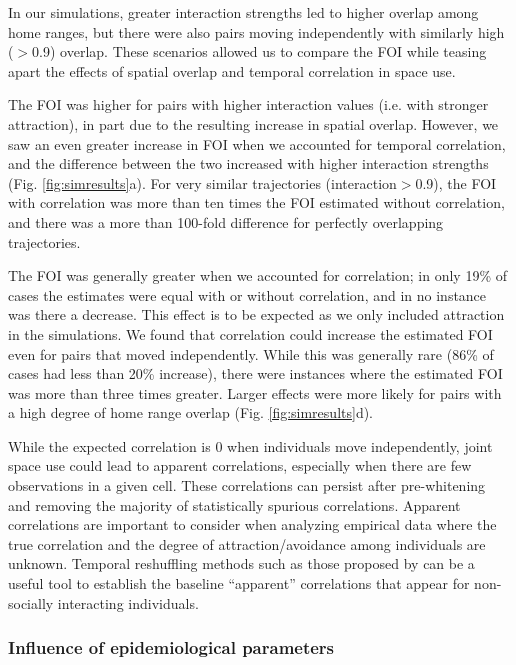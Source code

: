 ﻿\documentclass[11pt]{article}
\begin{document}
In our simulations, greater interaction strengths led to higher overlap among home ranges, but there were also pairs moving independently with similarly high  ($>$0.9) overlap. 
These scenarios allowed us to compare the FOI while teasing apart the effects of spatial overlap and temporal correlation in space use. 

The FOI was higher for pairs with higher interaction values (i.e. with stronger attraction), in part due to the resulting increase in spatial overlap. 
However, we saw an even greater increase in FOI when we accounted for temporal correlation, and the difference between the two increased with higher interaction strengths (Fig. \ref{fig:simresults}a). For very similar trajectories (interaction$>$0.9), the FOI with correlation was more than ten times the FOI estimated without correlation, and there was a more than 100-fold difference for perfectly overlapping trajectories.  


The FOI was generally greater when we accounted for correlation; in only 19\% of cases the estimates were equal with or without correlation, and in no instance was there a decrease. This effect is to be expected as we only included attraction in the simulations. 
We found that correlation could increase the estimated FOI even for pairs that moved independently. While this was generally rare (86\% of cases had less than 20\% increase),
there were  instances where the estimated FOI was more than three times greater. Larger effects were more likely for pairs with a high degree of home range overlap (Fig. \ref{fig:simresults}d). 

While the expected correlation is 0 when individuals move independently, joint space use could lead to apparent correlations, especially when there are few observations in a given cell. These correlations can persist after pre-whitening and removing the majority of statistically spurious correlations. Apparent correlations are important to consider when analyzing empirical data where the true correlation and the degree of attraction/avoidance among individuals are unknown. Temporal reshuffling methods such as those proposed by \citet{Spiegel2016} can be a useful tool to establish the baseline ``apparent'' correlations that appear for non-socially interacting individuals.

\subsubsection*{Influence of epidemiological parameters}
\end{document}
